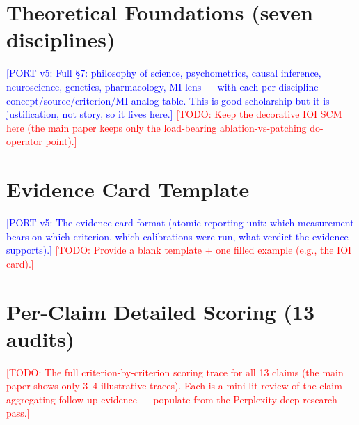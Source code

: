 \documentclass{article}
\newcommand{\TODO}[1]{\textcolor{red}{[TODO: #1]}}
\newcommand{\PORT}[1]{\textcolor{blue}{[PORT v5: #1]}}
\begin{document}
\section{Theoretical Foundations (seven disciplines)}
\PORT{Full \S7: philosophy of science, psychometrics, causal inference, neuroscience,
genetics, pharmacology, MI-lens --- with each per-discipline concept/source/criterion/MI-analog
table. This is good scholarship but it is justification, not story, so it lives here.}
\TODO{Keep the decorative IOI SCM here (the main paper keeps only the load-bearing
ablation-vs-patching do-operator point).}

\section{Evidence Card Template}
\PORT{The evidence-card format (atomic reporting unit: which measurement bears on which
criterion, which calibrations were run, what verdict the evidence supports).}
\TODO{Provide a blank template + one filled example (e.g., the IOI card).}

\section{Per-Claim Detailed Scoring (13 audits)}
\TODO{The full criterion-by-criterion scoring trace for all 13 claims (the main paper shows
only 3--4 illustrative traces). Each is a mini-lit-review of the claim aggregating follow-up
evidence --- populate from the Perplexity deep-research pass.}
\end{document}

